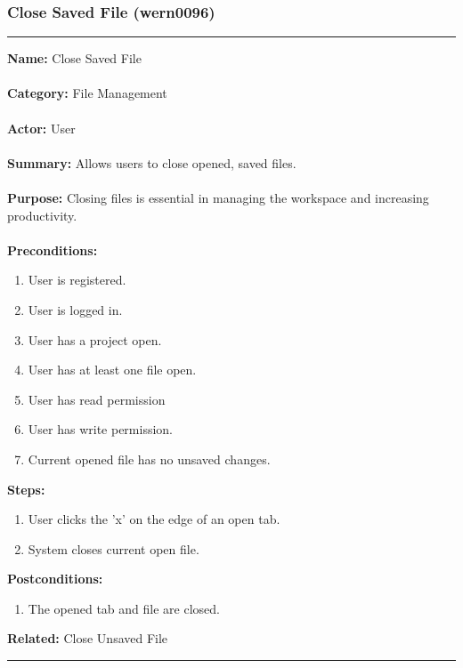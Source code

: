 \documentclass[11pt]{report}
\begin{document}
\newpage

\subsubsection{Close Saved File (wern0096)}
\vspace{2pt}
\hrule
\vspace{8pt}
	\noindent\textbf{Name:} Close Saved File \\ \\
	\textbf{Category:} File Management \\ \\
	\textbf{Actor:} User \\ \\
	\textbf{Summary:} Allows users to close opened, saved files. \\ \\
	\textbf{Purpose:} Closing files is essential in managing the workspace and increasing productivity. \\ \\
	\textbf{Preconditions:} 
	\begin{enumerate}
		\item User is registered.
		\item User is logged in.
		\item User has a project open.
		\item User has at least one file open.
		\item User has read permission
		\item User has write permission.
		\item Current opened file has no unsaved changes.
	\end{enumerate}		
	\textbf{Steps:}
	\begin{enumerate}
		\item User clicks the 'x' on the edge of an open tab.
		\item System closes current open file.
	\end{enumerate}	
	\textbf{Postconditions:}
	\begin{enumerate}
		\item The opened tab and file are closed.
	\end{enumerate}
	\textbf{Related:} Close Unsaved File
\hrule
\vspace{8pt}

\newpage
\end{document}

